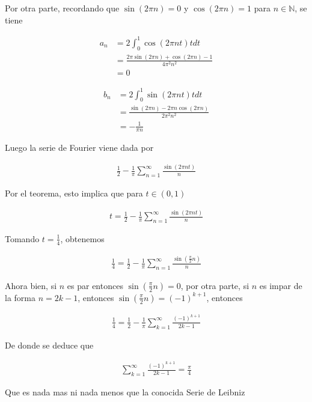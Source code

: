 \documentclass{article}
\theoremstyle{plain}
\theoremstyle{definition}
\begin{document}
Por otra parte, recordando que $\sin(2\pi n) =0$ y $\cos(2\pi n) =1$ para $ n\in \mathbb{N}$, se tiene

\begin{align*}
    a_n &= 2 \int_0^1 \cos(2\pi n t)t dt \\
     &= \frac{2\pi \sin(2\pi n)+\cos(2\pi n)-1}{4\pi^2 n^2} \\
     &= 0
\end{align*}

\begin{align*}
    b_n &= 2 \int_0^1 \sin(2\pi n t)t dt \\
     &= \frac{\sin(2\pi n)-2\pi n\cos(2\pi n)}{2\pi^2 n^2}\\
     &= -\frac{1}{\pi n}
\end{align*}

Luego la serie de Fourier viene dada por

\begin{align*}
    \frac{1}{2} - \frac{1}{\pi}\sum_{n=1}^\infty \frac{\sin(2\pi n t)}{n}
\end{align*}

Por el teorema, esto implica que para $t \in (0,1)$

\begin{align*}
  t =  \frac{1}{2} - \frac{1}{\pi}\sum_{n=1}^\infty \frac{\sin(2\pi n t)}{n}
\end{align*}


Tomando $t= \frac{1}{4}$, obtenemos



\begin{align*}
 \frac{1}{4} =  \frac{1}{2} - \frac{1}{\pi}\sum_{n=1}^\infty \frac{\sin\left( \frac{\pi}{2} n\right)}{n}
\end{align*}

Ahora bien, si $n$ es par entonces $\sin\left( \frac{\pi}{2} n\right) = 0$, por otra parte, si $n$ es impar de la forma $n = 2k -1 $, entonces $\sin\left( \frac{\pi}{2} n\right) = (-1)^{k+1}$, entonces

\begin{align*}
 \frac{1}{4} =  \frac{1}{2} - \frac{1}{\pi}\sum_{k=1}^\infty \frac{ (-1)^{k+1}}{2k-1}
\end{align*}

De donde se deduce que

\begin{align*}
\sum_{k=1}^\infty \frac{ (-1)^{k+1}}{2k-1} = \frac{\pi}{4}
\end{align*}

Que es nada mas ni nada menos que la conocida Serie de Leibniz  \\
\end{document}
